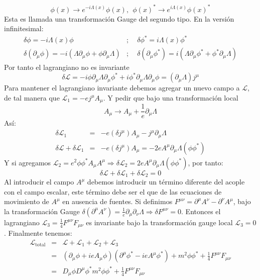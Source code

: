 \begin{equation}
\phi(x)\to e^{-i\Lambda(x)}\phi(x),\ \ \phi(x)^{*}\to e^{i\Lambda(x)}\phi(x)^{*}
\end{equation}
Esta es llamada una transformación Gauge del segundo tipo. En la versión infinitesimal:
\begin{eqnarray}
\nonumber \delta\phi=-i\Lambda(x)\phi &;&\ \ \delta\phi^{*}=i\Lambda(x)\phi^{*}\\
\delta(\partial_{\mu}\phi)=-i(\Lambda\partial_{\mu}\phi+\phi\partial_{\mu}\Lambda)&;&\ \ \delta(\partial_{\mu}\phi^{*})=i(\Lambda\partial_{\mu}\phi^{*}+\phi^{*}\partial_{\mu}\Lambda)
\end{eqnarray}
Por tanto el lagrangiano no es invariante
\begin{equation}
\delta\mathcal{L}=-i\phi\partial_{\mu}\Lambda\partial_{\mu}\phi^{*}+i\phi^{*}\partial_{\mu}\Lambda\partial_{\mu}\phi=(\partial_{\mu}\Lambda)j^{\mu}
\end{equation}
Para mantener el lagrangiano invariante debemos agregar un nuevo campo a $\mathcal{L}$, de tal manera que $\mathcal{L}_1=-ej^\mu A_\mu$. Y pedir que bajo una transformación local 
\begin{equation}
A_\mu \to A_\mu +\frac{1}{e}\partial_\mu\Lambda
\end{equation} 
Así:
\begin{eqnarray}
\nonumber \delta\mathcal{L}_{1}&=&-e(\delta j^{\mu})A_{\mu}-j^{\mu}\partial_{\mu}\Lambda\\
\delta\mathcal{L}+\delta\mathcal{L}_{1}&=&-e(\delta j^{\mu})A_{\mu}=-2eA^{\mu}\partial_{\mu}\Lambda(\phi\phi^{*})
\end{eqnarray}
Y si agregamos $\mathcal{L}_2=e^2\phi\phi^{*}A_\mu A^\mu\Rightarrow \delta\mathcal{L}_2=2eA^{\mu}\partial_{\mu}\Lambda(\phi\phi^{*})$, por tanto:
\begin{equation}
\delta\mathcal{L}+\delta\mathcal{L}_1+\delta\mathcal{L}_2=0
\end{equation}
Al introducir el campo $ A^\mu$ debemos introducir un término diferente del acople con el campo escalar, este término debe ser el que de las ecuaciones de movimiento de $ A^\mu$ en ausencia de fuentes. Si definimos $F^{\mu\nu}=\partial^{\mu}A^{\nu}-\partial^{\nu}A^{\mu}$, bajo la transformación Gauge $\delta(\partial^{\mu}A^{\nu})=\frac{1}{e}\partial_{\mu}\partial_{\nu}\Lambda\Rightarrow\delta F^{\mu\nu}=0$. Entonces el lagrangiano $\mathcal{L}_{3}=\frac{1}{4}F^{\mu\nu}F_{\mu\nu}$ es invariante bajo la transformación gauge local $\mathcal{L}_3=0$. Finalmente tenemos:
\begin{eqnarray}
\nonumber\mathcal{L}_{\text{total}}&=&\mathcal{L}+\mathcal{L}_1+\mathcal{L}_2+\mathcal{L}_3\\
\nonumber &=& (\partial_{\mu}\phi+ieA_{\mu}\phi)(\partial^{\mu}\phi^{*}-ieA^{\mu}\phi^{*})+m^{2}\phi\phi^{*}+\frac{1}{4}F^{\mu\nu}F_{\mu\nu}\\
&=& D_{\mu}\phi D^{\mu}\phi^{*}m^{2}\phi\phi^{*}+\frac{1}{4}F^{\mu\nu}F_{\mu\nu}
\end{eqnarray}
